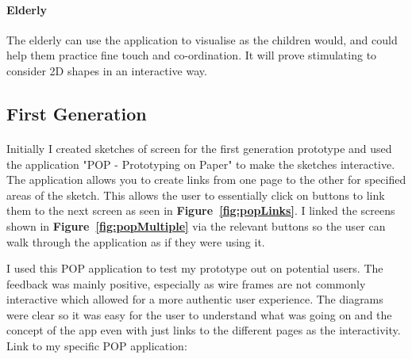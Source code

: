\documentclass[11pt]{article}
\begin{document}
            \paragraph{Elderly}
            The elderly can use the application to visualise as the children would, and could help them practice fine touch and co-ordination. It will prove stimulating to consider 2D shapes in an interactive way. 
            \clearpage
            
            \subsection{First Generation}
                    
                \paragraph{}
                Initially I created sketches of screen for the first generation prototype and used the application "POP - Prototyping on Paper" %
                to make the sketches interactive. The application allows you to create links from one page to the other for specified areas of the sketch. This allows the user to essentially click on buttons to link them to the next screen as seen in \textbf{Figure~\ref{fig:popLinks}}. I linked the screens shown in  \textbf{Figure~\ref{fig:popMultiple}} via the relevant buttons so the user can walk through the application as if they were using it.
                
                I used this POP application to test my prototype out on potential users. The feedback was mainly positive, especially as wire frames are not commonly interactive which allowed for a more authentic user experience. The diagrams were clear so it was easy for the user to understand what was going on and the concept of the app even with just links to the different pages as the interactivity.
                Link to my specific POP application: 
                
\end{document}
